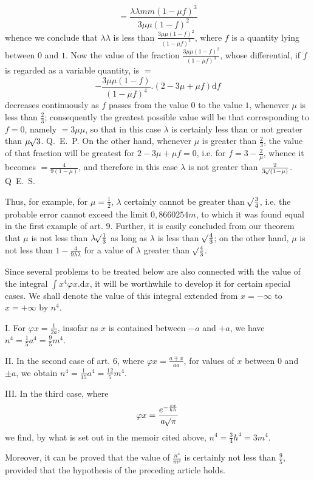 \[
=\frac{\lambda\lambda mm(1-\mu f)^3}{3\mu\mu(1-f)^2}
\]
whence we conclude that \(\lambda\lambda\) is less than \(\frac{3\mu\mu(1-f)^2}{(1-\mu f)^3}\), where \(f\) is a quantity lying between \(0\) and \(1\). Now the value of the fraction \(\frac{3\mu\mu(1-f)^2}{(1-\mu f)^3}\), whose differential, if \(f\) is regarded as a variable quantity, is \(=\)
\[
-\frac{3\mu\mu(1-f)}{(1-\mu f)^4}.(2-3\mu+\mu f)\mathrm{d}f
\]
decreases continuously as \(f\) passes from the value \(0\) to the value \(1\), whenever \(\mu\) is less than \(\tfrac23\); consequently the greatest possible value will be that corresponding to \(f=0\), namely \(=3\mu\mu\), so that in this case \(\lambda\) is certainly less than or not greater than \(\mu\mathord{{}^{}\!\surd}3\). Q.~E.~P. On the other hand, whenever \(\mu\) is greater than \(\tfrac23\), the value of that fraction will be greatest for \(2-3\mu+\mu f=0\), i.e. for \(f=3-\tfrac2\mu\), whence it becomes \(=\frac4{9(1-\mu)}\), and therefore in this case \(\lambda\) is not greater than \(\frac2{3\mathord{{}^{}\!\surd}(1-\mu)}\). Q~E.~S.

Thus, for example, for \(\mu=\tfrac12\), \(\lambda\) certainly cannot be greater than \(\mathord{{}^{}\!\surd}\tfrac34\), i.e. the probable error cannot exceed the limit \(0{,}8660254m\), to which it was found equal in the first example of art. 9. Further, it is easily concluded from our theorem that \(\mu\) is not less than \(\lambda\mathord{{}^{}\!\surd}\tfrac13\) as long as \(\lambda\) is less than \(\mathord{{}^{}\!\surd}\tfrac43\); on the other hand, \(\mu\) is not less than \(1-\frac4{9\lambda\lambda}\) for a value of \(\lambda\) greater than \(\mathord{{}^{}\!\surd}\tfrac43\).

Since several problems to be treated below are also connected with the value of the integral \(\int x^4\varphi x.\mathrm{d}x\), it will be worthwhile to develop it for certain special cases. We shall denote the value of this integral extended from \(x=-\infty\) to \(x=+\infty\) by \(n^4\).

I. For \(\varphi x=\tfrac1{2a}\), insofar as \(x\) is contained between \(-a\) and \(+a\), we have \(n^4=\tfrac15a^4=\tfrac95m^4\).

II. In the second case of art. 6, where \(\varphi x=\frac{a\mp x}{aa}\), for values of \(x\) between \(0\) and \(\pm a\), we obtain \(n^4=\tfrac1{15}a^4=\tfrac{12}{5}m^4\).

III. In the third case, where
\[
\varphi x=\frac{e^{-\frac{xx}{hh}}}{a\mathord{{}^{}\!\surd}\pi}
\]
we find, by what is set out in the memoir cited above, \(n^4=\tfrac34h^4=3m^4\).

Moreover, it can be proved that the value of \(\frac{n^4}{m^4}\) is certainly not less than \(\tfrac95\), provided that the hypothesis of the preceding article holds.

\clearpage
